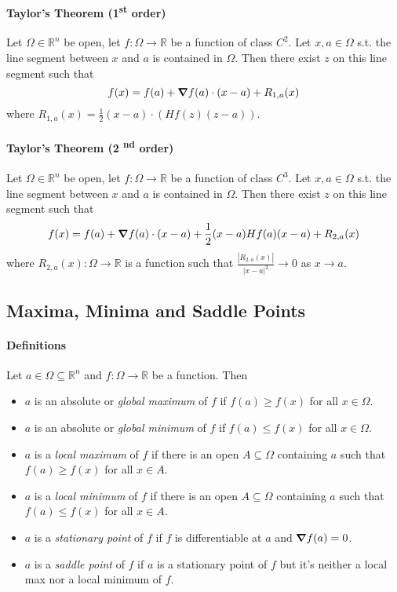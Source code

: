 \paragraph{Taylor's Theorem (1\textsuperscript{st} order)}
Let \(\Omega \in \mathbb R^n\) be open, let \(f:\Omega \to \mathbb R\) be a function
of class \(C^2\). Let \(x, a \in \Omega\) s.t. the line segment between \(x\) and \(a\) is
contained in \(\Omega.\) Then there exist \(z\) on this line segment such that 
\[f(x) = f(a) + \grad f(a) \cdot (x-a) + R_{1,a}(x)\]
where \(R_{1,a}(x) = \frac{1}{2}(x-a) \cdot (Hf(z)(z-a))\).

\paragraph{Taylor's Theorem (2 \textsuperscript{nd} order)}
Let \(\Omega \in \mathbb R^n\) be open, let \(f:\Omega \to \mathbb R\) be a function
of class \(C^3\). Let \(x, a \in \Omega\) s.t. the line segment between \(x\) and \(a\) is
contained in \(\Omega.\) Then there exist \(z\) on this line segment such that 
\[f(x) = f(a) + \grad f(a) \cdot (x-a) + \frac{1}{2}(x-a)Hf(a)(x-a) + R_{2,a}(x)\]
where \(R_{2,a}(x): \Omega \to \mathbb R\) is a function such that 
\(\frac{|R_{2,a}(x)|}{|x-a|^2} \to 0\) as \(x \to a\).

\subsection{Maxima, Minima and Saddle Points}
\paragraph{Definitions} Let \(a \in \Omega \subseteq \mathbb R^n\) and \(f: \Omega \to \mathbb R\) be a function. Then
\begin{itemize}
    \item \(a\) is an absolute or \textit{global maximum} of \(f\) if \(f(a) \geq f(x)\) for all \(x \in \Omega\).
    \item \(a\) is an absolute or \textit{global minimum} of \(f\) if \(f(a) \leq f(x)\) for all \(x \in \Omega\).
    \item \(a\) is a \textit{local maximum} of \(f\) if there is an open \(A \subseteq \Omega\) containing \(a\) such that \(f(a) \geq f(x)\) for all \(x \in A\).
    \item \(a\) is a \textit{local minimum} of \(f\) if there is an open \(A \subseteq \Omega\) containing \(a\) such that \(f(a) \leq f(x)\) for all \(x \in A\).
    \item \(a\) is a \textit{stationary point} of \(f\) if \(f\) is differentiable at \(a\) and \(\grad f(a) = 0\).
    \item \(a\) is a \textit{saddle point} of \(f\) if \(a\) is a stationary point of \(f\) but it's neither a local max nor a local minimum of \(f\).
\end{itemize}

